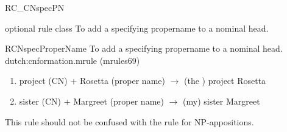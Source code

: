 \begin{mruleclass}{RC\_CNspecPN}
\begin{classdescr}
\kind optional rule class
\classtask To add a specifying propername to a nominal head.
\classremarks

\nofilters

\nospeedrules

\noplannedrules

\norulesnotince


\end{classdescr}

\begin{members}


\begin{member}
 RCNspecProperName
 To add a specifying propername to a nominal head.
\file dutch:cnformation.mrule (mrules69)
\semantics \nosemantics
\example \mbox{}
\begin{enumerate}
  \item 
project (CN) + Rosetta (proper name) $\rightarrow$ 
(the ) project Rosetta
  \item
sister (CN) + Margreet (proper name) $\rightarrow$ 
(my) sister Margreet
\end{enumerate}
\remarks\mbox{}
This rule should not be confused with the rule for NP-appositions.
\end{member}
\end{members}

\end{mruleclass}

